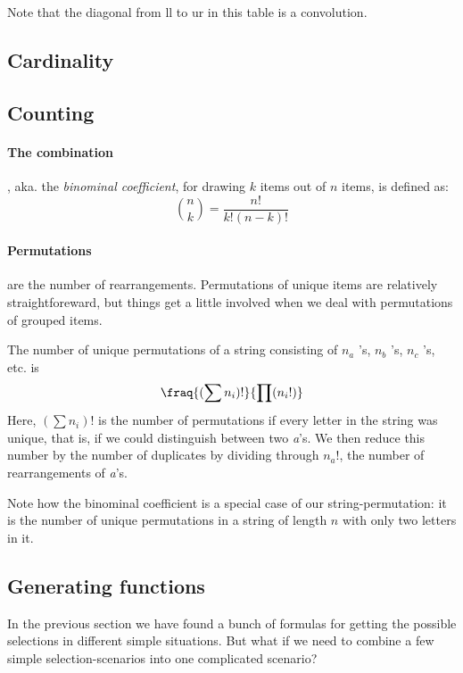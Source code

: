 Note that the diagonal from ll to ur in this table is a convolution. 

\subsection{Cardinality}


\subsection{Counting}

\paragraph{The combination}, aka. the \emph{binominal coefficient}, for drawing $k$ items out of $n$ items,  is defined as: 
$$ \binom{n}{k} = \frac{ n! }{ k!(n-k)! }$$

\paragraph{Permutations} are the number of rearrangements. Permutations of unique items are relatively straightforeward, but things get a little involved when we deal with permutations of grouped items. 

The number of unique permutations of a string consisting of $n_a$ 's, $n_b$ 's, $n_c$ 's, etc. is 
$$ \fraq{( \sum n_i )!}{\prod (n_i !)} $$
Here, $( \sum n_i )! $ is the number of permutations if every letter in the string was unique, that is, if we could distinguish between two \emph{a}'s. We then reduce this number by the number of duplicates by dividing through $n_a !$, the number of rearrangements of \emph{a}'s.

Note how the binominal coefficient is a special case of our string-permutation: it is the number of unique permutations in a string of length $n$ with only two letters in it. 



\subsection{Generating functions}

In the previous section we have found a bunch of formulas for getting the possible selections in different simple situations. But what if we need to combine a few simple selection-scenarios into one complicated scenario? 

